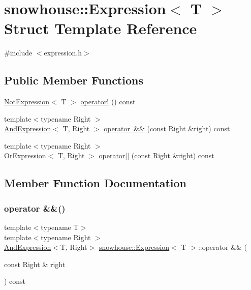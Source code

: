 \hypertarget{structsnowhouse_1_1Expression}{}\section{snowhouse\+::Expression$<$ T $>$ Struct Template Reference}
\label{structsnowhouse_1_1Expression}


{\ttfamily \#include $<$expression.\+h$>$}

\subsection*{Public Member Functions}
\begin{DoxyCompactItemize}
\item 
\mbox{\hyperlink{structsnowhouse_1_1NotExpression}{Not\+Expression}}$<$ T $>$ \mbox{\hyperlink{structsnowhouse_1_1Expression_ae4d059058cf45bd82ff171d4ea2a1bdd}{operator!}} () const
\item 
{\footnotesize template$<$typename Right $>$ }\\\mbox{\hyperlink{structsnowhouse_1_1AndExpression}{And\+Expression}}$<$ T, Right $>$ \mbox{\hyperlink{structsnowhouse_1_1Expression_a8886d6835a3583c7ec5668308a6b68a7}{operator \&\&}} (const Right \&right) const
\item 
{\footnotesize template$<$typename Right $>$ }\\\mbox{\hyperlink{structsnowhouse_1_1OrExpression}{Or\+Expression}}$<$ T, Right $>$ \mbox{\hyperlink{structsnowhouse_1_1Expression_a45b684f655be24a0ef5f79e2568735d9}{operator$\vert$$\vert$}} (const Right \&right) const
\end{DoxyCompactItemize}


\subsection{Member Function Documentation}
\mbox{\label{structsnowhouse_1_1Expression_a8886d6835a3583c7ec5668308a6b68a7}} 
\subsubsection{\texorpdfstring{operator \&\&()}{operator \&\&()}}
{\footnotesize\ttfamily template$<$typename T$>$ \\
template$<$typename Right $>$ \\
\mbox{\hyperlink{structsnowhouse_1_1AndExpression}{And\+Expression}}$<$T, Right$>$ \mbox{\hyperlink{structsnowhouse_1_1Expression}{snowhouse\+::\+Expression}}$<$ T $>$\+::operator \&\& (\begin{DoxyParamCaption}\item[{const Right \&}]{right }\end{DoxyParamCaption}) const\hspace{0.3cm}{\ttfamily [inline]}}

